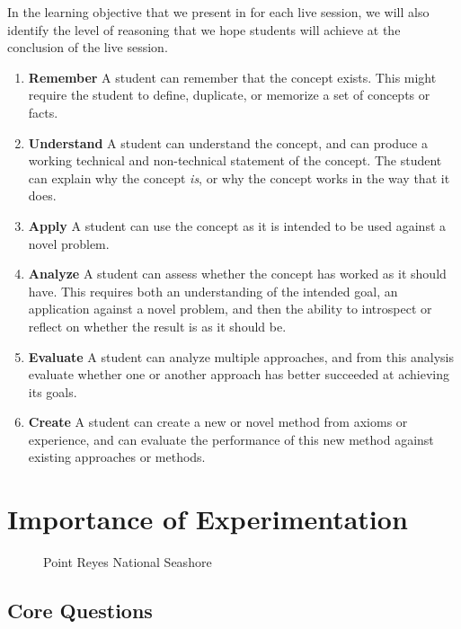 \documentclass[
]{article}
\makeatletter
\newcommand*\pandocbounded[1]{%
  \sbox\pandoc@box{#1}%
  \Gscale@div\@tempa{\textheight}{\dimexpr\ht\pandoc@box+\dp\pandoc@box\relax}%
  \Gscale@div\@tempb{\linewidth}{\wd\pandoc@box}%
  \ifdim\@tempb\p@<\@tempa\p@\let\@tempa\@tempb\fi%
  \ifdim\@tempa\p@<\p@\scalebox{\@tempa}{\usebox\pandoc@box}%
  \else\usebox{\pandoc@box}%
  \fi%
}
\providecommand{\tightlist}{%
  \setlength{\itemsep}{0pt}\setlength{\parskip}{0pt}}
\theoremstyle{definition}
\theoremstyle{definition}
\theoremstyle{definition}
\theoremstyle{definition}
\theoremstyle{remark}
\makeatother
\begin{document}
In the learning objective that we present in for each live session, we will also identify the level of reasoning that we hope students will achieve at the conclusion of the live session.

\begin{enumerate}
\def\labelenumi{\arabic{enumi}.}
\tightlist
\item
  \textbf{Remember} A student can remember that the concept exists. This might require the student to define, duplicate, or memorize a set of concepts or facts.
\item
  \textbf{Understand} A student can understand the concept, and can produce a working technical and non-technical statement of the concept. The student can explain why the concept \emph{is}, or why the concept works in the way that it does.
\item
  \textbf{Apply} A student can use the concept as it is intended to be used against a novel problem.
\item
  \textbf{Analyze} A student can assess whether the concept has worked as it should have. This requires both an understanding of the intended goal, an application against a novel problem, and then the ability to introspect or reflect on whether the result is as it should be.
\item
  \textbf{Evaluate} A student can analyze multiple approaches, and from this analysis evaluate whether one or another approach has better succeeded at achieving its goals.
\item
  \textbf{Create} A student can create a new or novel method from axioms or experience, and can evaluate the performance of this new method against existing approaches or methods.
\end{enumerate}

\section{Importance of Experimentation}\label{importance-of-experimentation}

\begin{figure}
\centering
\pandocbounded{\texttt{[image: ./images/point\_reyes.jpg]}}
\caption{Point Reyes National Seashore}
\end{figure}

\subsection{Core Questions}\label{core-questions-1}
\end{document}
